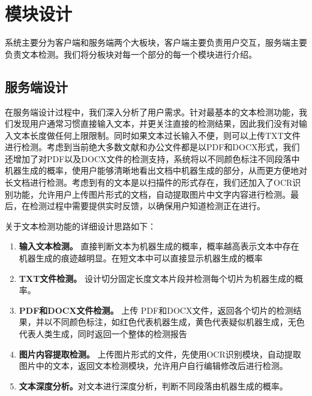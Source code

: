 \documentclass[a4paper]{report}
\begin{document}
\section{模块设计}
系统主要分为客户端和服务端两个大板块，客户端主要负责用户交互，服务端主要负责文本检测。我们将分板块对每一个部分的每一个模块进行介绍。
\subsection{服务端设计}
在服务端设计过程中，我们深入分析了用户需求。针对最基本的文本检测功能，我们发现用户通常习惯直接输入文本，并更关注直接的检测结果，因此我们没有对输入文本长度做任何上限限制。同时如果文本过长输入不便，则可以上传TXT文件进行检测。考虑到当前绝大多数文献和办公文件都是以PDF和DOCX形式，我们还增加了对PDF以及DOCX文件的检测支持，系统将以不同颜色标注不同段落中机器生成的概率，使用户能够清晰地看出文档中机器生成的部分，从而更方便地对长文档进行检测。考虑到有的文本是以扫描件的形式存在，我们还加入了OCR识别功能，允许用户上传图片形式的文档，自动提取图片中文字内容进行检测。最后，在检测过程中需要提供实时反馈，以确保用户知道检测正在进行。

关于文本检测功能的详细设计思路如下：
\begin{enumerate}
	\item \textbf{输入文本检测。} 直接判断文本为机器生成的概率，概率越高表示文本中存在机器生成的痕迹越明显。在短文本中可以直接显示机器生成的概率
	\item \textbf{TXT文件检测。} 设计切分固定长度文本片段并检测每个切片为机器生成的概率。
	\item \textbf{PDF和DOCX文件检测。} 上传 PDF和DOCX文件，返回各个切片的检测结果，并以不同颜色标注，如红色代表机器生成，黄色代表疑似机器生成，无色代表人类生成，同时返回一个整体的检测报告
	\item \textbf{图片内容提取检测。}  上传图片形式的文件，先使用OCR识别模块，自动提取图片中的文本，返回文本检测模块，允许用户自行编辑修改后进行检测。
	\item \textbf{文本深度分析。}对文本进行深度分析，判断不同段落由机器生成的概率。
\end{enumerate}
\end{document}

